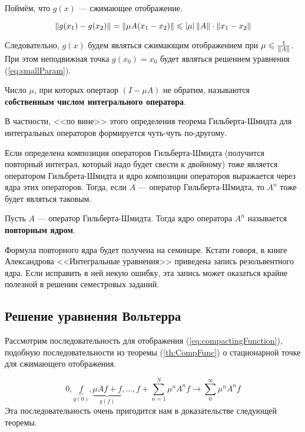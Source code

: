 \documentclass[12pt]{article}
\begin{document}
		Поймём, что $g(x)$ --- сжимающее отображение.
	
		$$\left\| g(x_1) - g(x_2) \right\| = \left\| \mu A(x_1 - x_2) \right\| \leqslant \left| \mu \right| \left\| A \right\| \cdot \left\| x_1 - x_2 \right\|$$
	
		Следовательно, $g(x)$ будем являться сжимающим отображением при $\mu \leqslant \frac{1}{\left\| A \right\|}$. При этом
		неподвижная точка $g(x_0) = x_0$ будет являться решением уравнения (\ref{eq:smallParam}).
	
		\begin{defi}
			Число $\mu$, при которых опертаор $(I - \mu A)$ не обратим, называются \textbf{собственным числом
			интегрального оператора}.
		\end{defi}
	
		В частности, <<по вине>> этого определения теорема Гильберта-Шмидта для интегральных операторов формируется
		чуть-чуть по-другому.
	
		Если определена композиция операторов Гильберта-Шмидта (получится повторный интеграл, который надо будет 
		свести к двойному) тоже является оператором Гильбрета-Шмидта и ядро композиции операторов выражается 
		через ядра этих операторов. Тогда, если $A$ --- оператор Гильберта-Шмидта, то $A^n$ тоже будет являться
		таковым.
	
		\begin{defi}
			Пусть $A$ --- оператор Гильберта-Шмидта. Тогда ядро оператора $A^n$ называется \textbf{повторным ядром}.
		\end{defi}
	
		{\footnotesize
		Формула повторного ядра будет получена на семинаре. Кстати говоря, в книге Александрова <<Интегральные уравнения>>
		приведена запись резольвентного ядра. Если исправить в ней некую ошибку, эта запись может оказаться крайне полезной
		в решении семестровых заданий.\par
		}

	\subsection{Решение уравнения Вольтерра}

		Рассмотрим последовательность для отображения (\ref{eq:compactingFunction}), подобную последовательности
		из теоремы (\ref{th:CompFunc}) о стационарной точке для сжимающего отображения.
	
		$$0, \underbrace{f}_{g(0)}, \underbrace{\mu Af + f}_{g(f)}, \ldots, f + \sum_{n=1}^N \mu^nA^nf \rightarrow \sum_0^{\infty} \mu^nA^n f$$
		Эта последовательность очень пригодится нам в доказательстве следующей теоремы.	
	
\end{document}
